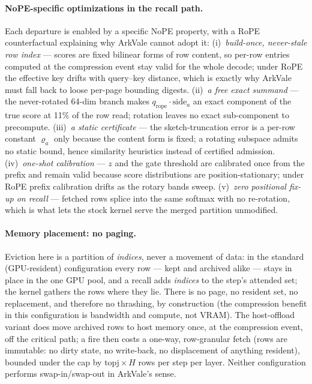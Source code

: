 \documentclass[11pt]{article}
\begin{document}
\paragraph{NoPE-specific optimizations in the recall path.} Each departure
is enabled by a specific NoPE property, with a RoPE counterfactual
explaining why ArkVale cannot adopt it:
(i)~\emph{build-once, never-stale row index} --- scores are fixed bilinear
forms of row content, so per-row entries computed at the compression event
stay valid for the whole decode; under RoPE the effective key drifts with
query--key distance, which is exactly why ArkVale must fall back to loose
per-page bounding digests.
(ii)~\emph{a free exact summand} --- the never-rotated 64-dim branch makes
$q_{\mathrm{rope}}\cdot\mathrm{side}_a$ an exact component of the true score
at 11\% of the row read; rotation leaves no exact sub-component to
precompute.
(iii)~\emph{a static certificate} --- the sketch-truncation error is a
per-row constant $\varrho_a$ only because the content form is fixed; a
rotating subspace admits no static bound, hence similarity heuristics
instead of certified admission.
(iv)~\emph{one-shot calibration} --- $z$ and the gate threshold are
calibrated once from the prefix and remain valid because score distributions
are position-stationary; under RoPE prefix calibration drifts as the rotary
bands sweep.
(v)~\emph{zero positional fix-up on recall} --- fetched rows splice into the
same softmax with no re-rotation, which is what lets the stock kernel serve
the merged partition unmodified.

\paragraph{Memory placement: no paging.} Eviction here is a partition of
\emph{indices}, never a movement of data: in the standard (GPU-resident)
configuration every row --- kept and archived alike --- stays in place in
the one GPU pool, and a recall adds \emph{indices} to the step's attended
set; the kernel gathers the rows where they lie. There is no page, no
resident set, no replacement, and therefore no thrashing, by construction
(the compression benefit in this configuration is bandwidth and compute, not
VRAM). The host-offload variant does move archived rows to host memory once,
at the compression event, off the critical path; a fire then costs a
one-way, row-granular fetch (rows are immutable: no dirty state, no
write-back, no displacement of anything resident), bounded under the cap by
$\mathrm{topj}\times H$ rows per step per layer. Neither configuration
performs swap-in/swap-out in ArkVale's sense.
\end{document}
